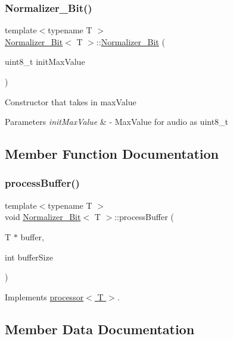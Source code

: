 \subsubsection{\texorpdfstring{Normalizer\+\_\+Bit()}{Normalizer\_8Bit()}}
{\footnotesize\ttfamily template$<$typename T $>$ \\
\hyperlink{classNormalizer__8Bit}{Normalizer\+\_\+Bit}$<$ T $>$\+::\hyperlink{classNormalizer__8Bit}{Normalizer\+\_\+Bit} (\begin{DoxyParamCaption}\item[{uint8\+\_\+t}]{init\+Max\+Value }\end{DoxyParamCaption})}

Constructor that takes in max\+Value 
\begin{DoxyParams}{Parameters}
{\em init\+Max\+Value} & -\/ Max\+Value for audio as uint8\+\_\+t \\
\hline
\end{DoxyParams}


\subsection{Member Function Documentation}
\mbox{\label{classNormalizer__8Bit_aaadd6fc8065b38bd09021d9a6bf93c03}} 
\subsubsection{\texorpdfstring{process\+Buffer()}{processBuffer()}}
{\footnotesize\ttfamily template$<$typename T $>$ \\
void \hyperlink{classNormalizer__8Bit}{Normalizer\+\_\+Bit}$<$ T $>$\+::process\+Buffer (\begin{DoxyParamCaption}\item[{T $\ast$}]{buffer,  }\item[{int}]{buffer\+Size }\end{DoxyParamCaption})\hspace{0.3cm}{\ttfamily [virtual]}}



Implements \hyperlink{classprocessor_ab23d53c7dd927e50108272ee007dcc29}{processor$<$ T $>$}.



\subsection{Member Data Documentation}
\mbox{\label{classNormalizer__8Bit_a1680eafc06ae62344d8968028e2b07c1}} 
